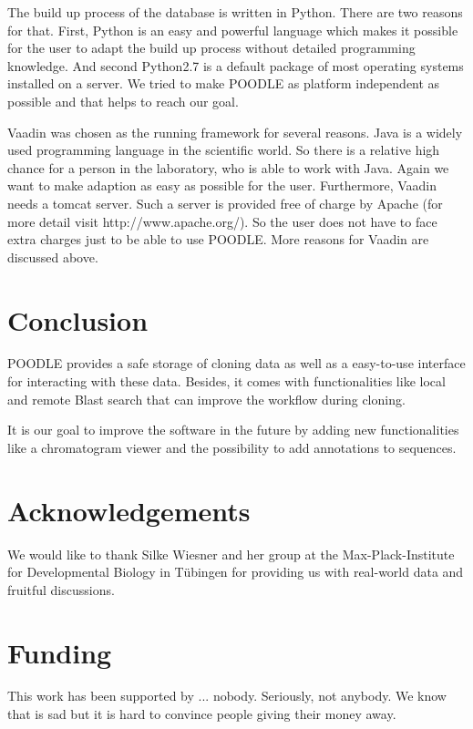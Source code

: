 \documentclass{bioinfo}
\begin{document}
The build up process of the database is written in Python. There are two reasons for that. First, 
Python is an easy and powerful language which makes it possible for the user to adapt the build up 
process without detailed programming knowledge. And second Python2.7 is a default package of most 
operating systems installed on a server. We tried to make POODLE as platform independent as possible 
and that helps to reach our goal.

Vaadin was chosen as the running framework for several reasons. Java is a widely used programming language 
in the scientific world. So there is a relative high chance for a person in the laboratory, who 
is able to work with
Java. Again we want to make adaption as easy as possible for the user. Furthermore, Vaadin needs a 
tomcat server. Such a server is provided free of charge by Apache (for more detail visit http://www.apache.org/). 
So the user does not have to face extra charges just to be able to use POODLE. More reasons for 
Vaadin are discussed above.

\section{Conclusion}

POODLE provides a safe storage of cloning data as well as a easy-to-use interface for 
interacting with these data. Besides, it comes with functionalities like local and remote Blast 
search that can improve the workflow during cloning. 

It is our goal to improve the software in the future by adding new functionalities like a chromatogram 
viewer and the possibility to add annotations to sequences. 

\section*{Acknowledgements}

We would like to thank Silke Wiesner and her group at the Max-Plack-Institute for Developmental Biology 
in T\"{u}bingen for providing us with real-world data and fruitful discussions.

\section*{Funding}

This work has been supported by ... nobody. Seriously, not anybody. We know that is sad but it is hard 
to convince people giving their money away.
\end{document}

